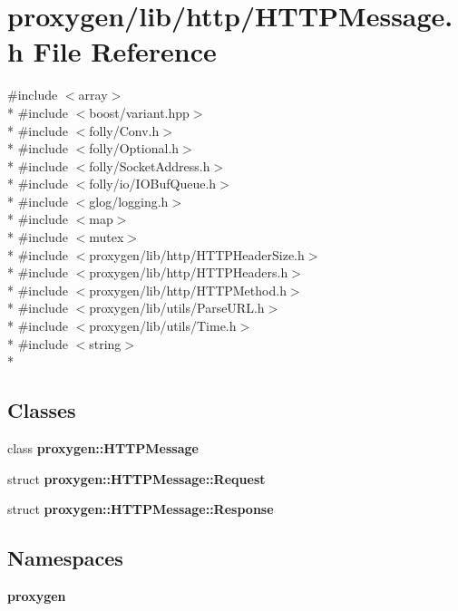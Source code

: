 \section{proxygen/lib/http/\+H\+T\+T\+P\+Message.h File Reference}
\label{HTTPMessage_8h}
{\ttfamily \#include $<$array$>$}\\*
{\ttfamily \#include $<$boost/variant.\+hpp$>$}\\*
{\ttfamily \#include $<$folly/\+Conv.\+h$>$}\\*
{\ttfamily \#include $<$folly/\+Optional.\+h$>$}\\*
{\ttfamily \#include $<$folly/\+Socket\+Address.\+h$>$}\\*
{\ttfamily \#include $<$folly/io/\+I\+O\+Buf\+Queue.\+h$>$}\\*
{\ttfamily \#include $<$glog/logging.\+h$>$}\\*
{\ttfamily \#include $<$map$>$}\\*
{\ttfamily \#include $<$mutex$>$}\\*
{\ttfamily \#include $<$proxygen/lib/http/\+H\+T\+T\+P\+Header\+Size.\+h$>$}\\*
{\ttfamily \#include $<$proxygen/lib/http/\+H\+T\+T\+P\+Headers.\+h$>$}\\*
{\ttfamily \#include $<$proxygen/lib/http/\+H\+T\+T\+P\+Method.\+h$>$}\\*
{\ttfamily \#include $<$proxygen/lib/utils/\+Parse\+U\+R\+L.\+h$>$}\\*
{\ttfamily \#include $<$proxygen/lib/utils/\+Time.\+h$>$}\\*
{\ttfamily \#include $<$string$>$}\\*
\subsection*{Classes}
\begin{DoxyCompactItemize}
\item 
class {\bf proxygen\+::\+H\+T\+T\+P\+Message}
\item 
struct {\bf proxygen\+::\+H\+T\+T\+P\+Message\+::\+Request}
\item 
struct {\bf proxygen\+::\+H\+T\+T\+P\+Message\+::\+Response}
\end{DoxyCompactItemize}
\subsection*{Namespaces}
\begin{DoxyCompactItemize}
\item 
 {\bf proxygen}
\end{DoxyCompactItemize}
